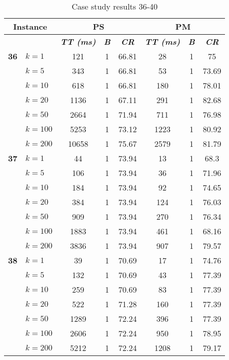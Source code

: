     \begin{table}[htbp]
    \caption{Case study results 36-40}
    \centering
    \begin{tabular}{|l|l|c|c|c|c|c|c|}
    \hline
    \multicolumn{ 2}{|c|}{\textbf{Instance}} & \multicolumn{ 3}{c|}{\textbf{PS}} & \multicolumn{ 3}{c|}{\textbf{PM}} \\ \hline
    \multicolumn{ 2}{|l|}{} & \textbf{\textit{TT (ms)}} & \textbf{\textit{B}} & \textbf{\textit{CR}} & \textbf{\textit{TT (ms)}} & \textbf{\textit{B}} & \textbf{\textit{CR}} \\ \hline
    \multicolumn{1}{|r|}{\textbf{36}} & $k=1$ & 121 & 1 & 66.81 & 28 & 1 & 75 \\ 
     & $k=5$ & 343 & 1 & 66.81 & 53 & 1 & 73.69 \\ 
     & $k=10$ & 618 & 1 & 66.81 & 180 & 1 & 78.01 \\ 
     & $k=20$ & 1136 & 1 & 67.11 & 291 & 1 & 82.68 \\ 
     & $k=50$ & 2664 & 1 & 71.94 & 711 & 1 & 76.98 \\ 
     & $k=100$ & 5253 & 1 & 73.12 & 1223 & 1 & 80.92 \\ 
     & $k=200$ & 10658 & 1 & 75.67 & 2579 & 1 & 81.79 \\ \hline
    \multicolumn{1}{|r|}{\textbf{37}} & $k=1$ & 44 & 1 & 73.94 & 13 & 1 & 68.3 \\ 
     & $k=5$ & 106 & 1 & 73.94 & 36 & 1 & 71.96 \\ 
     & $k=10$ & 184 & 1 & 73.94 & 92 & 1 & 74.65 \\ 
     & $k=20$ & 384 & 1 & 73.94 & 124 & 1 & 76.03 \\ 
     & $k=50$ & 909 & 1 & 73.94 & 270 & 1 & 76.34 \\ 
     & $k=100$ & 1883 & 1 & 73.94 & 461 & 1 & 68.16 \\ 
     & $k=200$ & 3836 & 1 & 73.94 & 907 & 1 & 79.57 \\ \hline
    \multicolumn{1}{|r|}{\textbf{38}} & $k=1$ & 39 & 1 & 70.69 & 17 & 1 & 74.76 \\ 
     & $k=5$ & 132 & 1 & 70.69 & 43 & 1 & 77.39 \\ 
     & $k=10$ & 259 & 1 & 70.69 & 83 & 1 & 77.39 \\ 
     & $k=20$ & 522 & 1 & 71.28 & 160 & 1 & 77.39 \\ 
     & $k=50$ & 1289 & 1 & 72.24 & 396 & 1 & 77.39 \\ 
     & $k=100$ & 2606 & 1 & 72.24 & 950 & 1 & 78.95 \\ 
     & $k=200$ & 5212 & 1 & 72.24 & 1208 & 1 & 79.17 \\ \hline

\end{tabular}
\end{table}
